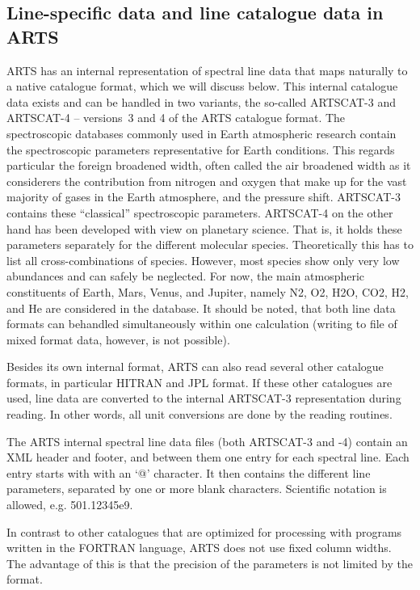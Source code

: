 \subsection{Line-specific data and line catalogue data in ARTS} 

ARTS has an internal representation of spectral line data that maps
naturally to a native catalogue format, which we will discuss
below. This internal catalogue data exists and can be
handled in two variants, the so-called ARTSCAT-3 and ARTSCAT-4 -- versions~3
and 4 of the ARTS catalogue format. The spectroscopic databases commonly
used in Earth atmospheric research contain the spectroscopic parameters
representative for Earth conditions. This regards particular the foreign
broadened width, often called the air broadened width as it considerers
the contribution from nitrogen and oxygen that make up for the vast majority
of gases in the Earth atmosphere, and the pressure shift. ARTSCAT-3 contains
these ``classical'' spectroscopic parameters. ARTSCAT-4 on the other hand has
been developed with view on planetary science. That is, it holds these
parameters separately for the different molecular species. Theoretically this
has to list all cross-combinations of species. However, most species show only
very low abundances and can safely be neglected. For now, the main atmospheric
constituents of Earth, Mars, Venus, and Jupiter, namely N2, O2, H2O, CO2, H2,
and He are considered in the database.
It should be noted, that both line data formats can behandled simultaneously
within one calculation (writing to file of mixed format data, however, is not
possible).

Besides its own internal format, ARTS can also read several other catalogue
formats, in particular HITRAN and JPL format. If these other catalogues are used,
line data are converted to the internal ARTSCAT-3 representation during
reading. In other words, all unit conversions are done by the reading
routines.

The ARTS internal spectral line data files (both ARTSCAT-3 and -4) contain
an XML header and footer, and between them one entry for each spectral line.
Each entry starts with with an `@' character. It then contains the different line
parameters, separated by one or more blank characters. Scientific
notation is allowed, e.g. 501.12345e9.  

In contrast to other catalogues that are optimized for processing with
programs written in the FORTRAN language, ARTS does not use fixed
column widths. The advantage of this is that the precision of the
parameters is not limited by the format.

